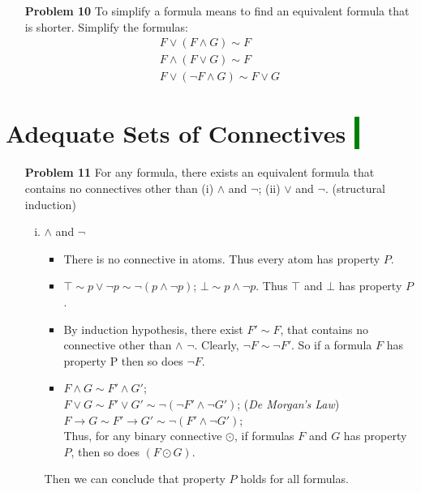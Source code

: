 \documentclass[12pt]{article}
\begin{document}
\begin{enumerate}
\item[\textbf{Problem 10}] To simplify a formula means to find an equivalent formula that is shorter. Simplify the formulas: 
\begin{gather*} 
 F \vee ( F \wedge G) \sim F \\
 F \wedge (F \vee G) \sim F \\
 F \vee (\neg F \wedge G) \sim F \vee G
\end{gather*}
 \end{enumerate}
 
 \newpage
\section*{Adequate Sets of Connectives \colorbox{green}{$~$ }}
\begin{enumerate}
\item[\textbf{Problem 11}] For any formula, there exists an equivalent formula that contains no connectives other than (i) $\wedge$ and $\neg$; (ii) $\vee$ and $\neg$.  (structural induction)
    \begin{enumerate} [(i)]
        \item $\wedge$ and $\neg$ 
            \begin{itemize}
                \item There is no connective in atoms. Thus every atom has property $P$. 
                \item $\top \sim p \vee \neg p \sim \neg (p \wedge \neg p)$; $\bot \sim p \wedge \neg p$. Thus $\top$ and $\bot$ has property $P$. 
                \item By induction hypothesis, there exist $F' \sim F$, that contains no connective other than $\wedge$  $\neg$.  Clearly, $\neg F \sim \neg F'$.  So if a formula $F$ has property P then so does $\neg F$. 
                \item $F \wedge G \sim F' \wedge G'$; \\
                 $F \vee G \sim F' \vee G' \sim \neg (\neg F' \wedge \neg G')$; (\textit{De Morgan's Law}) \\
                 $ F \rightarrow G \sim F' \rightarrow G' \sim \neg (F' \wedge \neg G')$;\\
                  Thus, for any binary connective $\odot$, if formulas $F$ and $G$ has property $P$, then so does $(F \odot G)$. 
            \end{itemize}
       Then we can conclude that property $P$ holds for all formulas.   
       

\end{enumerate}
\end{enumerate}
\end{document}
